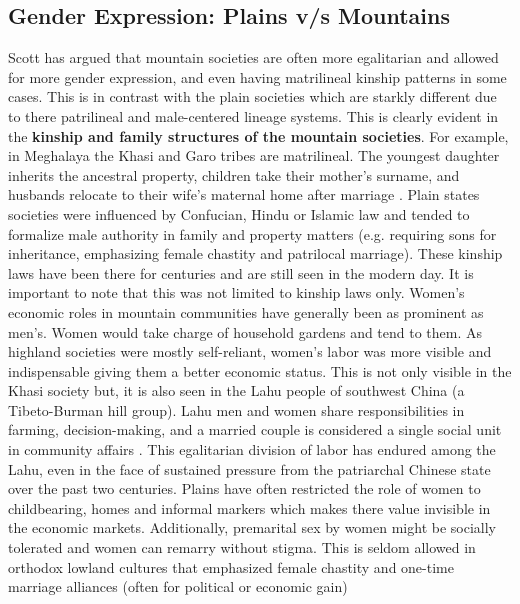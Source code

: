 \subsection{Gender Expression: Plains v/s Mountains}
\begin{sloppypar}
    Scott has argued that mountain societies are often more egalitarian and allowed for more gender expression, and even having matrilineal kinship patterns in some cases. This is in contrast with the plain societies which are starkly different due to there patrilineal and male\hyp{}centered lineage systems. This is clearly evident in the \textbf{kinship and family structures of the mountain societies}. For example, in Meghalaya the Khasi and Garo tribes are matrilineal. The youngest daughter inherits the ancestral property, children take their mother's surname, and husbands relocate to their wife's maternal home after marriage  \citep{Allen_2012}. Plain states societies were influenced by Confucian, Hindu or Islamic law and tended to formalize male authority in family and property matters (e.g. requiring sons for inheritance, emphasizing female chastity and patrilocal marriage). These kinship laws have been there for centuries and are still seen in the modern day. It is important to note that this was not limited to kinship laws only. Women's economic roles in mountain communities have generally been as prominent as men's. Women would take charge of household gardens and tend to them. As highland societies were mostly self\hyp{}reliant, women's labor was more visible and indispensable giving them a better economic status. This is not only visible in the Khasi society but, it is also seen in the Lahu people of southwest China (a Tibeto\hyp{}Burman hill group). Lahu men and women share responsibilities in farming, decision\hyp{}making,  and a married couple is considered a single social unit in community affairs \citep{Du_2015}. This egalitarian division of labor has endured among the Lahu, even in the face of sustained pressure from the patriarchal Chinese state over the past two centuries. Plains have often restricted the role of women to childbearing, homes and informal markers which makes there value invisible in the economic markets. Additionally, premarital sex by women might be socially tolerated and women can remarry without stigma. This is seldom allowed in orthodox lowland cultures that emphasized female chastity and one\hyp{}time marriage alliances (often for political or economic gain)

\end{sloppypar}
